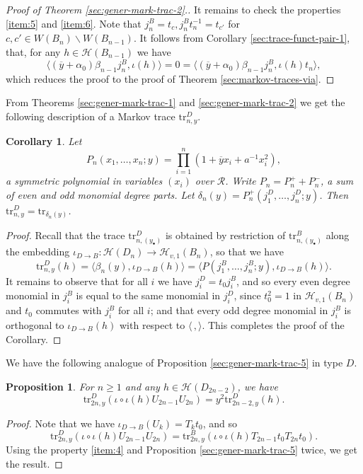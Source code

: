 \documentclass[11pt,leqno]{article}
\newtheorem{proposition}[theorem]{Proposition}
\newtheorem{corollary}[theorem]{Corollary}%
\theoremstyle{definition}
\theoremstyle{definition}
\theoremstyle{remark}
\newcommand{\He}{\mathcal{H}}
\newcommand{\tr}{\mathrm{tr}}
\begin{document}
\begin{proof}[Proof of Theorem \ref{sec:gener-mark-trac-2}.]
  It remains to check the properties \ref{item:5} and \ref{item:6}. Note that $j^B_n = t_{c}, j^B_nt_n^{-1} = t_{c'}$ for $c, c' \in W(B_n)\backslash W(B_{n-1})$. It follows from Corollary \ref{sec:trace-funct-pair-1}, that, for any $h\in \He(B_{n-1})$ we have
  \[
    \langle (\overline{y}+\alpha_0)\beta_{n-1}j_n^{B}, \iota(h) \rangle = 0 = \langle (\overline{y}+\alpha_0)\beta_{n-1}j_n^{B}, \iota(h)t_n\rangle,
  \]
  which reduces the proof to the proof of Theorem \ref{sec:markov-traces-via}.
\end{proof}
From Theorems \ref{sec:gener-mark-trac-1} and \ref{sec:gener-mark-trac-2} we get the following description of a Markov trace $\tr^D_{n,y}$.
\begin{corollary}
\label{sec:gener-mark-trac-4}  Let \[P_n(x_1, \dots, x_n;y) = \prod_{i=1}^n(1 + \overline{y}x_i + a^{-1}x_i^2),\] a symmetric polynomial in variables $(x_i)$ over $\mathcal{R}$. Write $P_n = P_n^+ + P_n^-$, a sum of even and odd monomial degree parts. Let $\delta_n(y) = P_n^+(j_1^D, \dots, j_n^D;y)$. Then $\tr_{n,y}^D = \tr_{\delta_n(y)}$.
\end{corollary}
\begin{proof}
  Recall that the trace $\tr_{n,(y_{\bullet})}^D$ is obtained by restriction of $\tr_{n,(y_{\bullet})}^B$ along the embedding $\iota_{D\to B}:\He(D_n) \to \He_{v,1}(B_n)$, so that we have
  \[
    \tr_{n,y}^D(h) = \langle \beta_n(y),\iota_{D\to B}(h)\rangle = \langle P(j_1^B,\dots,j_n^B;y),\iota_{D\to B}(h)\rangle.
  \]
  It remains to observe that for all $i$ we have $j_i^D = t_0j_i^B$, and so every even degree monomial in $j_i^B$ is equal to the same monomial in $j_i^D$, since $t_0^2 = 1$ in $\He_{v,1}(B_n)$ and $t_0$ commutes with $j_i^B$ for all $i$; and that every odd degree monomial in $j_i^B$ is orthogonal to $\iota_{D\to B}(h)$ with respect to $\langle\,,\rangle$. This completes the proof of the Corollary.
\end{proof}
We have the following analogue of Proposition \ref{sec:gener-mark-trac-5} in type $D$.
\begin{proposition}
  \label{sec:gener-mark-trac-6}
For $n \geq 1$ and any $h \in \He(D_{2n-2})$, we have \[\tr_{2n,y}^D(\iota\circ\iota(h)U_{2n-1}U_{2n}) = y^2\tr_{2n-2,y}^D(h).\]
\end{proposition}
\begin{proof}
 Note that we have $\iota_{D \to B}(U_k) = T_kt_0$, and so 
\[\tr_{2n,y}^D(\iota\circ\iota(h)U_{2n-1}U_{2n}) = \tr_{2n,y}^B(\iota\circ\iota(h)T_{2n-1}t_0T_{2n}t_0).\]
Using the property \ref{item:4} and Proposition \ref{sec:gener-mark-trac-5} twice, we get the result. 
\end{proof}
\end{document}
